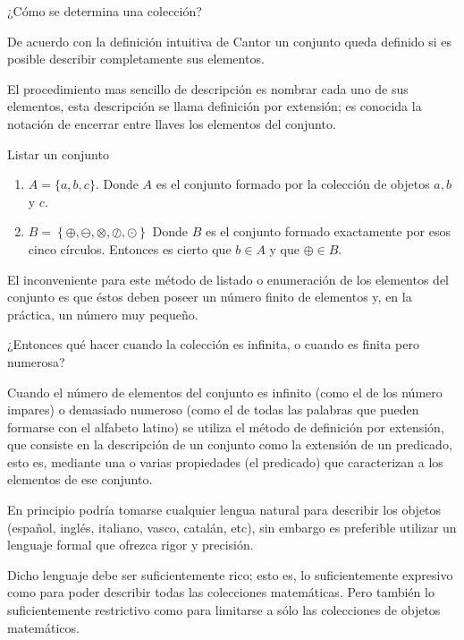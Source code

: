 ¿Cómo se determina una colección? 

De acuerdo con la definición intuitiva de Cantor un conjunto queda
definido si es posible describir completamente sus elementos. 

\begin{lista}

\item  El procedimiento mas sencillo de descripción es nombrar cada
uno de sus elementos, esta descripción se llama definición por extensión;
es conocida la notación de encerrar entre llaves los elementos del
conjunto. 

\begin{ejemplo}{Listar un conjunto }\begin{enumerate} 

\item$A=\{a,b,c\}$. Donde $A$ es el conjunto formado por la colección
de objetos $a,b$ y $c$.

\item $B=\left\{ \oplus,\ominus,\otimes,\oslash,\odot\right\} $
Donde $B$ es el conjunto formado exactamente por esos cinco círculos.
Entonces es cierto que $b\in A$ y que $\oplus\in B$.

\end{enumerate}\end{ejemplo}

El inconveniente para este método de listado o enumeración de los
elementos del conjunto es que éstos deben poseer un número finito
de elementos y, en la práctica, un número muy pequeño.

¿Entonces qué hacer cuando la colección es infinita, o cuando es finita
pero numerosa? 

\item Cuando el número de elementos del conjunto es infinito (como
el de los número impares) o demasiado numeroso (como el de todas las
palabras que pueden formarse con el alfabeto latino) se utiliza el
método de definición por extensión, que consiste en la descripción
de un conjunto como la extensión de un predicado, esto es, mediante
una o varias propiedades (el predicado) que caracterizan a los elementos
de ese conjunto.

En principio podría tomarse cualquier lengua natural para describir
los objetos (español, inglés, italiano, vasco, catalán, etc), sin
embargo es preferible utilizar un lenguaje formal que ofrezca rigor
y precisión. 

Dicho lenguaje debe ser suficientemente rico; esto es, lo suficientemente
expresivo como para poder describir todas las colecciones matemáticas.
Pero también lo suficientemente restrictivo como para limitarse a
sólo las colecciones de objetos matemáticos. 


\end{lista}
